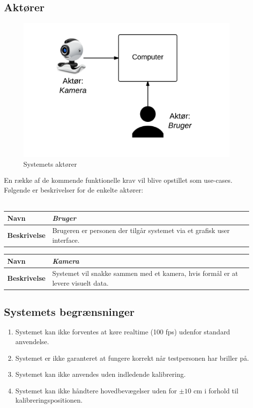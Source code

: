 \documentclass[kravspec.tex]{subfiles}
\begin{document}
\subsection{Aktører}
\begin{figure}[h]
\centering
\includegraphics[width=0.7\linewidth]{../Actors}
\caption{Systemets aktører}
\label{fig:Actors}
\end{figure}

En række af de kommende funktionelle krav vil blive opstillet som use-cases. Følgende er beskrivelser for de enkelte aktører: \\
\\
\begin{tabular}{| l | p{10cm} |}
	\hline 
	\textbf{Navn} & \textit{Bruger} \\ \hline
	\textbf{Beskrivelse} & Brugeren er personen der tilgår systemet via et grafisk user interface.\\ \hline
\end{tabular}
\newline
\vspace*{0.7 cm}
\newline
\begin{tabular}{| l | p{10cm} |}
	\hline 
	\textbf{Navn} & \textit{Kamera} \\ \hline
	\textbf{Beskrivelse} & Systemet vil snakke sammen med et kamera, hvis formål er at levere visuelt data.\\ \hline
\end{tabular}

\subsection{Systemets begrænsninger}
\begin{enumerate}
	\item Systemet kan ikke forventes at køre realtime (100 fps) udenfor standard anvendelse.
\item 
Systemet er ikke garanteret at fungere korrekt når testpersonen har briller på.
\item 
Systemet kan ikke anvendes uden indledende kalibrering.
\item 
Systemet kan ikke håndtere hovedbevægelser uden for $\pm10$ cm i forhold til kalibreringspositionen.
\end{enumerate}
\end{document}

